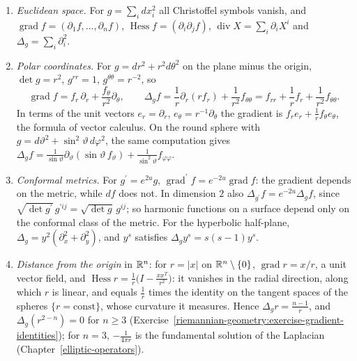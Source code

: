 \begin{example}\label{riemannian-geometry:example-gradient-hessian}
\begin{enumerate}
\item \emph{Euclidean space.} For $g = \sum_idx_i^2$ all Christoffel symbols vanish, and $\operatorname{grad}f = (\partial_1f, \ldots, \partial_nf)$, $\operatorname{Hess}f = (\partial_i\partial_jf)$,
$\operatorname{div}X = \sum_i\partial_iX^i$ and $\Delta_g = \sum_i\partial_i^2$.
\item \emph{Polar coordinates.} For $g = dr^2 + r^2d\theta^2$ on the plane minus the origin, $\det g = r^2$, $g^{rr} = 1$, $g^{\theta\theta} = r^{-2}$, so
\[
\operatorname{grad}f = f_r\,\partial_r + \frac{f_\theta}{r^2}\partial_\theta, \qquad \Delta_gf = \frac1r\partial_r(rf_r) + \frac{1}{r^2}f_{\theta\theta} = f_{rr} + \frac1rf_r + \frac{1}{r^2}f_{\theta\theta} .
\]
In terms of the unit vectors $e_r = \partial_r$, $e_\theta = r^{-1}\partial_\theta$ the gradient is $f_re_r + \frac1rf_\theta e_\theta$, the formula of vector calculus. On the round sphere with
$g = d\vartheta^2 + \sin^2\vartheta\,d\varphi^2$, the same computation gives $\Delta_gf = \frac{1}{\sin\vartheta}\partial_\vartheta(\sin\vartheta\,f_\vartheta) + \frac{1}{\sin^2\vartheta}f_{\varphi\varphi}$.
\item \emph{Conformal metrics.} For $g^{\prime} = e^{2u}g$, $\operatorname{grad}^{\prime}f = e^{-2u}\operatorname{grad}f$: the gradient depends on the metric, while $df$ does not. In dimension $2$ also
$\Delta_{g^{\prime}}f = e^{-2u}\Delta_gf$, since $\sqrt{\det g^{\prime}}\,g^{\prime ij} = \sqrt{\det g}\,g^{ij}$; so harmonic functions on a surface depend only on the conformal class of the metric. For the
hyperbolic half-plane, $\Delta_g = y^2(\partial_x^2 + \partial_y^2)$, and $y^s$ satisfies $\Delta_gy^s = s(s - 1)y^s$.
\item \emph{Distance from the origin} in $\mathbb{R}^n$: for $r = |x|$ on $\mathbb{R}^n \setminus \{0\}$, $\operatorname{grad}r = x/r$, a unit vector field, and
$\operatorname{Hess}r = \frac1r\bigl(I - \frac{xx^T}{r^2}\bigr)$: it vanishes in the radial direction, along which $r$ is linear, and equals $\frac1r$ times the identity on the tangent spaces of the spheres
$\{r = \text{const}\}$, whose curvature it measures. Hence $\Delta_gr = \frac{n-1}{r}$, and $\Delta_g(r^{2-n}) = 0$ for $n \geq 3$ (Exercise~\ref{riemannian-geometry:exercise-gradient-identities}); for $n = 3$, $-\frac{1}{4\pi r}$ is the fundamental solution of the Laplacian
(Chapter~\ref{elliptic-operators}).
\end{enumerate}
\end{example}

